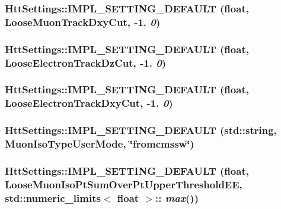 \hypertarget{classHttSettings_a12b52ff05d9b9f91e06534e4f59eb39c}{
\subsubsection[{IMPL\_\-SETTING\_\-DEFAULT}]{\setlength{\rightskip}{0pt plus 5cm}HttSettings::IMPL\_\-SETTING\_\-DEFAULT (float, \/  LooseMuonTrackDxyCut, \/  -\/1. {\em 0})}}
\label{classHttSettings_a12b52ff05d9b9f91e06534e4f59eb39c}
\hypertarget{classHttSettings_a6db5e1c7f0335291557d4f2b366b77e3}{
\subsubsection[{IMPL\_\-SETTING\_\-DEFAULT}]{\setlength{\rightskip}{0pt plus 5cm}HttSettings::IMPL\_\-SETTING\_\-DEFAULT (float, \/  LooseElectronTrackDzCut, \/  -\/1. {\em 0})}}
\label{classHttSettings_a6db5e1c7f0335291557d4f2b366b77e3}
\hypertarget{classHttSettings_a97479bda952e07f2f6b03b5be73d00f2}{
\subsubsection[{IMPL\_\-SETTING\_\-DEFAULT}]{\setlength{\rightskip}{0pt plus 5cm}HttSettings::IMPL\_\-SETTING\_\-DEFAULT (float, \/  LooseElectronTrackDxyCut, \/  -\/1. {\em 0})}}
\label{classHttSettings_a97479bda952e07f2f6b03b5be73d00f2}
\hypertarget{classHttSettings_ab08e3e8222e8746782c6151302295352}{
\subsubsection[{IMPL\_\-SETTING\_\-DEFAULT}]{\setlength{\rightskip}{0pt plus 5cm}HttSettings::IMPL\_\-SETTING\_\-DEFAULT (std::string, \/  MuonIsoTypeUserMode, \/  \char`\"{}fromcmssw\char`\"{})}}
\label{classHttSettings_ab08e3e8222e8746782c6151302295352}
\hypertarget{classHttSettings_ac15ce16c8e547817bd419f46fac8ebd9}{
\subsubsection[{IMPL\_\-SETTING\_\-DEFAULT}]{\setlength{\rightskip}{0pt plus 5cm}HttSettings::IMPL\_\-SETTING\_\-DEFAULT (float, \/  LooseMuonIsoPtSumOverPtUpperThresholdEE, \/  std::numeric\_\-limits$<$ float $>$:: {\em max}())}}
